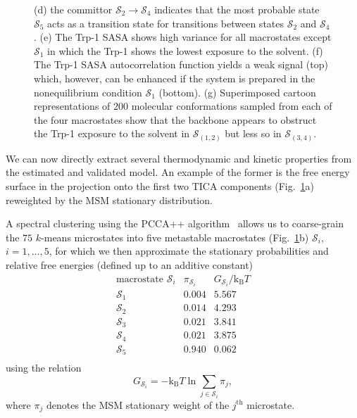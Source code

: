 \documentclass[9pt,tutorial]{livecoms}
\begin{document}
\begin{figure}
{(d) the committor $\mathcal{S}_2\to\mathcal{S}_4$ indicates that the most probable state $\mathcal{S}_5$ acts as a transition state for transitions between states $\mathcal{S}_2$ and $\mathcal{S}_4$.
(e) The Trp-1 SASA shows high variance for all macrostates except $\mathcal{S}_1$ in which the Trp-1 shows the lowest exposure to the solvent.
(f) The Trp-1 SASA autocorrelation function yields a weak signal (top) which, however, can be enhanced if the system is prepared in the nonequilibrium condition $\mathcal{S}_1$ (bottom).
(g) Superimposed cartoon representations of $200$ molecular conformations sampled from each of the four macrostates show that the backbone appears to obstruct the Trp-1 exposure to the solvent in $\mathcal{S}_{(1,2)}$ but less so in $\mathcal{S}_{(3,4)}$.}
\label{fig:msm-analysis}
\end{figure}

We can now directly extract several thermodynamic and kinetic properties from the estimated and validated model.
An example of the former is the free energy surface in the projection onto the first two TICA components (Fig.~\ref{fig:msm-analysis}a) reweighted by the MSM stationary distribution.

A spectral clustering using the PCCA++ algorithm~\cite{pcca++} allows us to coarse-grain the $75$ $k$-means microstates into five metastable macrostates (Fig.~\ref{fig:msm-analysis}b) $\mathcal{S}_i$, $i=1,\dots,5$, for which we then approximate the stationary probabilities and relative free energies (defined up to an additive constant)
\[ \begin{array}{ccc}
\textrm{macrostate } \mathcal{S}_i & \pi_{\mathcal{S}_i} & G_{\mathcal{S}_i} / \textrm{k}_\textrm{B} T \\
\hline
\mathcal{S}_1 & 0.004 & 5.567 \\
\mathcal{S}_2 & 0.014 & 4.293 \\
\mathcal{S}_3 & 0.021 & 3.841 \\
\mathcal{S}_4 & 0.021 & 3.875 \\
\mathcal{S}_5 & 0.940 & 0.062 \\
\end{array}\]
using the relation
\begin{equation}
\label{eq:fe}
G_{\mathcal{S}_i} = - \textrm{k}_\textrm{B} T \ln \sum\limits_{j\in \mathcal{S}_i} \pi_j,
\end{equation}
where $\pi_j$ denotes the MSM stationary weight of the $j^\textrm{th}$ microstate.
\end{document}
